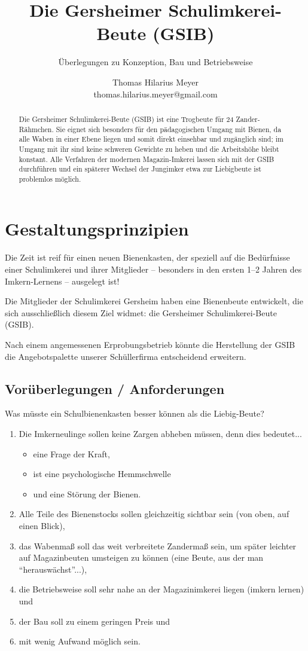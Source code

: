 \documentclass[12pt,a4paper,ngerman]{scrartcl}
\author{Thomas Hilarius Meyer\\ \textsf{thomas.hilarius.meyer@gmail.com}}
\title{Die Gersheimer Schulimkerei-Beute (GSIB)}
\subtitle{Überlegungen zu Konzeption, Bau und Betriebsweise}
\begin{document}
	\maketitle

        
\begin{abstract}
	Die Gersheimer Schulimkerei-Beute (GSIB) ist eine Trogbeute für 24 Zander-Rähmchen.
	Sie eignet sich besonders für den pädagogischen Umgang mit Bienen, da alle Waben in einer
	Ebene liegen und somit direkt einsehbar und zugänglich sind; im Umgang mit ihr sind
	keine schweren Gewichte zu heben und die Arbeitshöhe bleibt konstant.
	Alle Verfahren der modernen Magazin-Imkerei lassen sich mit der GSIB durchführen und
	ein späterer Wechsel der Jungimker etwa zur Liebigbeute ist problemlos möglich.
\end{abstract}


\section{Gestaltungsprinzipien}

Die Zeit ist reif für einen neuen Bienenkasten, der speziell auf die Bedürfnisse einer Schulimkerei und ihrer Mitglieder --
besonders in den ersten 1--2 Jahren des Imkern-Lernens -- ausgelegt ist!

Die Mitglieder der Schulimkerei Gersheim haben eine Bienenbeute entwickelt, die sich ausschließlich diesem Ziel widmet:
die Gersheimer Schulimkerei-Beute (GSIB).

Nach einem angemessenen Erprobungsbetrieb könnte die Herstellung der GSIB die Angebotspalette unserer Schüllerfirma
entscheidend erweitern.


\subsection{Vorüberlegungen / Anforderungen}

Was müsste ein Schulbienenkasten besser können als die Liebig-Beute?

\begin{enumerate}
\item Die Imkerneulinge sollen keine Zargen abheben müssen, denn dies bedeutet...
  \begin{itemize}
  \item eine Frage der Kraft,
  \item ist eine psychologische Hemmschwelle
  \item  und eine Störung der Bienen.
  \end{itemize}
\item Alle Teile des Bienenstocks sollen gleichzeitig sichtbar sein (von oben, auf einen Blick),
\item das Wabenmaß soll das weit verbreitete Zandermaß sein,
  um später leichter auf Magazinbeuten umsteigen zu können (eine Beute, aus der man \enquote{herauswächst}...),
\item die Betriebsweise soll sehr nahe an der Magazinimkerei liegen (imkern lernen) und
\item der Bau soll zu einem geringen Preis und
\item mit wenig Aufwand möglich sein.
\end{enumerate}
\end{document}

